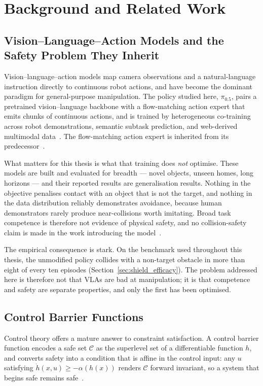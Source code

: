 \documentclass[a4paper,11pt]{report}
\begin{document}
\chapter{Background and Related Work}\label{ch:background}

\section{Vision--Language--Action Models and the Safety Problem They Inherit}
\label{sec:bg:vla}

Vision--language--action models map camera observations and a natural-language instruction
directly to continuous robot actions, and have become the dominant paradigm for general-purpose
manipulation. The policy studied here, $\pi_{0.5}$, pairs a pretrained vision--language backbone
with a flow-matching action expert that emits chunks of continuous actions, and is trained by
heterogeneous co-training across robot demonstrations, semantic subtask prediction, and
web-derived multimodal data~\cite{physicalintelligence2025pi05}. The flow-matching action expert
is inherited from its predecessor~\cite{black2024pi0}.

What matters for this thesis is what that training does \emph{not} optimise. These models are
built and evaluated for breadth --- novel objects, unseen homes, long horizons --- and their
reported results are generalisation results. Nothing in the objective penalises contact with an
object that is not the target, and nothing in the data distribution reliably demonstrates
avoidance, because human demonstrators rarely produce near-collisions worth imitating. Broad task
competence is therefore not evidence of physical safety, and no collision-safety claim is made in
the work introducing the model~\cite{physicalintelligence2025pi05}.

The empirical consequence is stark. On the benchmark used throughout this thesis, the unmodified
policy collides with a non-target obstacle in more than eight of every ten episodes
(Section~\ref{sec:shield_efficacy}). The problem addressed here is therefore not that VLAs are bad
at manipulation; it is that competence and safety are separate properties, and only the first has
been optimised.

\section{Control Barrier Functions}\label{sec:bg:cbf}

Control theory offers a mature answer to constraint satisfaction. A control barrier function
encodes a safe set $\mathcal{C}$ as the superlevel set of a differentiable function $h$, and
converts safety into a condition that is affine in the control input: any $u$ satisfying
$\dot{h}(x,u) \ge -\alpha(h(x))$ renders $\mathcal{C}$ forward invariant, so a system that begins
safe remains safe~\cite{ames2017cbf}.
\end{document}

